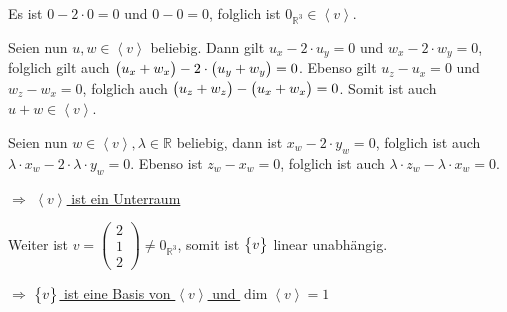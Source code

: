 \documentclass{scrreprt}
\newcommand\hull[1]{\left\langle #1 \right\rangle}
\begin{document}
\begin{enumerate}[(a)]

  Es ist $0 - 2 \cdot 0 = 0$ und $0 - 0 = 0$, folglich ist
  $0_{\mathbb{R}^3} \in \hull{v}$.

  Seien nun $u, w \in \hull{v}$ beliebig.
  Dann gilt $u_x - 2 \cdot u_y = 0$ und $w_x - 2 \cdot w_y = 0$,
  folglich gilt auch
  $\qty\big(u_x + w_x)- 2 \cdot \qty\big(u_y + w_y) = 0$.
  Ebenso gilt $u_z - u_x = 0$ und $w_z - w_x = 0$, folglich auch
  $\qty\big(u_z + w_z) - \qty\big(u_x + w_x) = 0$.
  Somit ist auch $u + w \in \hull{v}$.

  Seien nun $w \in \hull{v}, \lambda \in \mathbb{R}$ beliebig, dann ist
  $x_w - 2 \cdot y_w = 0$, folglich ist auch
  $\lambda \cdot x_w - 2 \cdot \lambda \cdot y_w = 0$.
  Ebenso ist $z_w - x_w = 0$, folglich ist auch
  $\lambda \cdot z_w - \lambda \cdot x_w = 0$.

  $\Rightarrow$ \underline{$\hull{v}$ ist ein Unterraum}

  Weiter ist
  $v = \begin{pmatrix} 2 \\ 1 \\ 2 \end{pmatrix} \ne 0_{\mathbb{R}^3}$,
  somit ist $\qty\big{v}$ linear unabhängig.

  $\Rightarrow$ \underline{$\qty\big{v}$ ist eine Basis von $\hull{v}$ und
    $\dim \hull{v} = 1$}
\end{enumerate}
\end{document}
